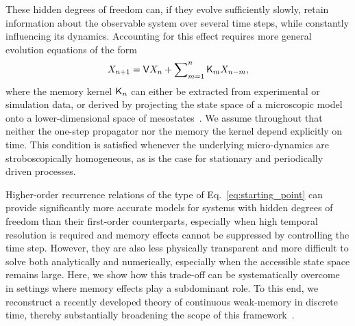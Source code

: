 \documentclass[aps,prl,reprint]{revtex4-2}
\begin{document}
These hidden degrees of freedom can, if they evolve sufficiently slowly, retain information about the observable system over several time steps, while constantly influencing its dynamics.
Accounting for this effect requires more general evolution equations of the form
\begin{equation}
    \label{eq:starting_point}
    X_{n+1} = \mathsf{V} X_n + \sum\nolimits_{m=1}^{n} \mathsf{K}_m X_{n-m},
\end{equation}
where the memory kernel $\mathsf{K}_n$ can either be extracted from experimental or simulation data, or derived by projecting the state space of a microscopic model onto a lower-dimensional space of mesostates~\cite{lesnickiMolecularHydrodynamics2016, jungIterativeReconstruction2017, meyerNumericalProcedure2020, vrugtProjectionOperatorsStatistical2020,
klippensteinIntroducingMemoryCoarseGrained2021,
schillingCoarsegrainedModellingOut2022,
hilderQuantitativeCoarseGrainingMarkov2024}.
We assume throughout that neither the one-step propagator nor the memory the kernel depend explicitly on time.
This condition is satisfied whenever the underlying micro-dynamics are stroboscopically homogeneous, as is the case for stationary and periodically driven processes.


Higher-order recurrence relations of the type of Eq.~\eqref{eq:starting_point} can provide significantly more accurate models for systems with hidden degrees of freedom than their first-order counterparts, especially when high temporal resolution is required and memory effects cannot be suppressed by controlling the time step.
However, they are also less physically transparent and more difficult to solve both analytically and numerically, especially when the accessible state space remains large.
Here, we show how this trade-off can be systematically overcome in settings where memory effects play a subdominant role.
To this end, we reconstruct a recently developed theory of continuous weak-memory in discrete time, thereby substantially broadening the scope of this framework~\cite{
brandnerDynamicsMicroscaleNanoscale2025a,
brandnerDynamicsMicroscaleNanoscale2025}.
\end{document}

